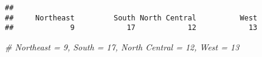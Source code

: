\documentclass[
]{article}
\newenvironment{Shaded}{\begin{snugshade}}{\end{snugshade}}
\newcommand{\CommentTok}[1]{\textcolor[rgb]{0.56,0.35,0.01}{\textit{#1}}}
\newcommand{\FunctionTok}[1]{\textcolor[rgb]{0.00,0.00,0.00}{#1}}
\newcommand{\NormalTok}[1]{#1}
\newcommand{\SpecialCharTok}[1]{\textcolor[rgb]{0.00,0.00,0.00}{#1}}
\begin{document}
\begin{Shaded}
\end{Shaded}

\begin{verbatim}
## 
##     Northeast         South North Central          West 
##             9            17            12            13
\end{verbatim}

\begin{Shaded}
\begin{Highlighting}[]
\CommentTok{\# Northeast = 9, South = 17, North Central = 12, West = 13}
\end{Highlighting}
\end{Shaded}
\end{document}
